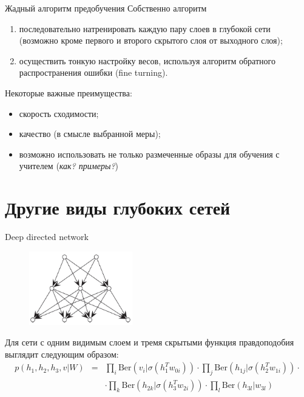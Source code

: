 \documentclass[10pt]{beamer}
\begin{document}
\begin{frame}{Жадный алгоритм предобучения}
Собственно алгоритм
\begin{enumerate}
	\item последовательно натренировать каждую пару слоев в глубокой сети (возможно кроме первого и второго скрытого слоя от выходного слоя);
	\item осуществить тонкую настройку весов, используя алгоритм обратного распространения ошибки (fine turning).
\end{enumerate}

Некоторые важные преимущества:
\begin{itemize}
	\item скорость сходимости;
	\item качество (в смысле выбранной меры);
	\item возможно использовать не только размеченные образы для обучения с учителем (\textit{как? примеры?})
\end{itemize}

\end{frame}


\section{Другие виды глубоких сетей}

\begin{frame}{Deep directed network}

\begin{figure}[h!]
  \centering
  \includegraphics[width=0.4\textwidth]{images/ddn.png}
\end{figure}
Для сети с одним видимым слоем и тремя скрытыми функция правдоподобия выглядит следующим образом:
\begin{eqnarray*}
p(h_1, h_2, h_3, v | W) &=& \prod_i \text{Ber}\left(v_i | \sigma\left(h_1^T w_{0i}\right)\right) \cdot \prod_j \text{Ber}\left(h_{1j} | \sigma\left(h_2^T w_{1i}\right)\right) \cdot \\
& & \cdot \prod_k \text{Ber}\left(h_{2k} | \sigma\left(h_3^T w_{2i}\right)\right) \cdot \prod_l \text{Ber}\left(h_{3l} | w_{3l}\right)
\end{eqnarray*}

\end{frame}
\end{document}
